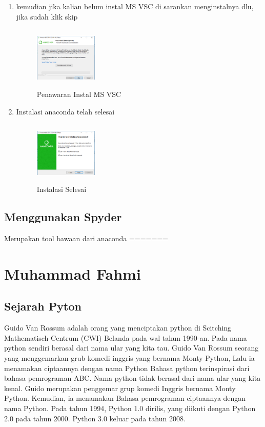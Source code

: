 \begin{enumerate}
    \item kemudian jika kalian belum instal MS VSC di sarankan menginstalnya dlu, jika sudah klik skip
    \begin{figure}[!htbp]
        \centering
        \includegraphics[width=3cm,height=3cm]{figures/sembilan.png}
        \caption{Penawaran Instal MS VSC}
        \label{offering}
        \end{figure}

    \item Instalasi anaconda telah selesai
    \begin{figure}[!htbp]
        \centering
        \includegraphics[width=3cm,height=3cm]{figures/sepuluh.png}
        \caption{Instalasi Selesai}
        \label{akhir}
        \end{figure}
\end{enumerate}
\subsection{Menggunakan Spyder}
Merupakan tool bawaan dari anaconda
=======
\section{Muhammad Fahmi}

\subsection{Sejarah Pyton}
Guido Van Rossum adalah orang yang menciptakan python di Scitching Mathematisch Centrum (CWI) Belanda pada wal tahun 1990-an. 
Pada nama python sendiri berasal dari nama ular yang kita tau. Guido Van Rossum seorang yang menggemarkan grub komedi inggris yang bernama Monty Python, Lalu ia menamakan ciptaannya dengan nama Python
Bahasa python terinspirasi dari bahasa pemrograman ABC. Nama python tidak berasal dari nama ular yang kita kenal. Guido merupakan penggemar grup komedi Inggris bernama Monty Python. Kemudian, ia menamakan Bahasa pemrograman ciptaannya dengan nama Python.
Pada tahun 1994, Python 1.0 dirilis, yang diikuti dengan Python 2.0 pada tahun 2000. Python 3.0 keluar pada tahun 2008.


